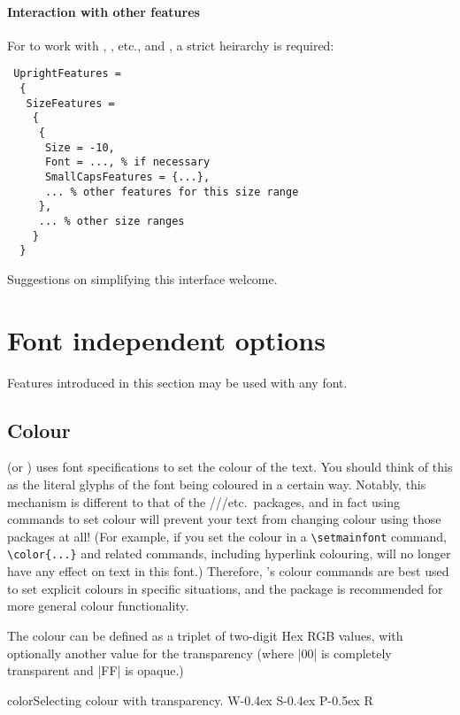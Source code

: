 \documentclass[a4paper]{l3doc}
\begin{document}
\paragraph{Interaction with other features}
For  to work with , , etc., and , a strict heirarchy is required:
\begin{Verbatim}
 UprightFeatures =
  {
   SizeFeatures =
    {
     {
      Size = -10,
      Font = ..., % if necessary
      SmallCapsFeatures = {...},
      ... % other features for this size range
     },
     ... % other size ranges
    }
  }
\end{Verbatim}
Suggestions on simplifying this interface welcome.


\section{Font independent options}
\label{sec:font-ind-features}

Features introduced in this section may be used with any font.

\subsection{Colour}

 (or ) uses font specifications to set the colour of
the text.
You should think of this as the literal glyphs of the font being coloured in a certain way.
Notably, this mechanism is different to that of the ///etc.\ packages, and in fact using  commands to set colour will prevent your text from changing colour using those packages at all!
(For example, if you set the colour in a \verb|\setmainfont| command, \verb|\color{...}| and related commands, including hyperlink colouring, will no longer have any effect on text in this font.)
Therefore, 's colour commands are best used to set explicit colours in specific situations, and the  package is recommended for more general colour functionality.

The colour can be defined as a triplet of two-digit Hex RGB
values, with optionally another value for the transparency (where
|00| is completely transparent and |FF| is opaque.)
\begin{Lexample}{color}{Selecting colour with transparency.}
  \fontsize{48}{48}
  {W}\kern-0.4ex
  {S}\kern-0.4ex
  {P}\kern-0.5ex
  {R}
\end{Lexample}
\end{document}
